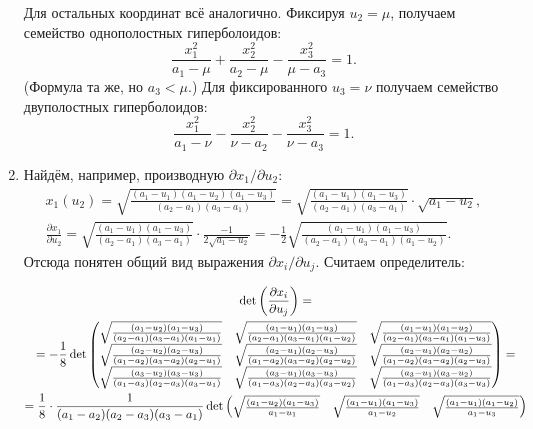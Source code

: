 \begin{solution}
\begin{enumerate}[nolistsep, label=(\arabic*)]
			Для остальных координат всё аналогично. Фиксируя $u_2 = \mu$, получаем семейство однополостных гиперболоидов:
			\[
				\frac{x_1^2}{a_1 - \mu} + \frac{x_2^2}{a_2 - \mu} - \frac{x_3^2}{\mu - a_3} = 1.
			\]
			(Формула та же, но $a_3 < \mu$.) Для фиксированного $u_3 = \nu$ получаем семейство двуполостных гиперболоидов:
			\[
				\frac{x_1^2}{a_1 - \nu} - \frac{x_2^2}{\nu - a_2} - \frac{x_3^2}{\nu - a_3} = 1.
			\]
		\item Найдём, например, производную $\partial x_1 / \partial u_2$:
			\begin{gather*}
				x_1(u_2) = \sqrt{\frac{(a_1 - u_1)(a_1 - u_2)(a_1 - u_3)}{(a_2 - a_1)(a_3 - a_1)}} = \sqrt{\frac{(a_1 - u_1)(a_1 - u_3)}{(a_2 - a_1)(a_3 - a_1)}} \cdot \sqrt{a_1 - u_2},\\
				\frac{\partial x_1}{\partial u_2} = \sqrt{\frac{(a_1 - u_1)(a_1 - u_3)}{(a_2 - a_1)(a_3 - a_1)}} \cdot \frac{-1}{2\sqrt{a_1 - u_2}} = -\frac{1}{2}\sqrt{\frac{(a_1 - u_1)(a_1 - u_3)}{(a_2 - a_1)(a_3 - a_1)(a_1 - u_2)}}.
			\end{gather*}
			Отсюда понятен общий вид выражения $\partial x_i / \partial u_j$. Считаем определитель:
			\begin{fullwidth}
				\begin{multline*}
					\det\left(\frac{\partial x_i}{\partial u_j}\right) =\\ = -\frac{1}{8}\det
					\begin{pmatrix}
						\sqrt{\frac{(a_1 - u_2)(a_1 - u_3)}{(a_2 - a_1)(a_3 - a_1)(a_1 - u_1)}} & \sqrt{\frac{(a_1 - u_1)(a_1 - u_3)}{(a_2 - a_1)(a_3 - a_1)(a_1 - u_2)}} & \sqrt{\frac{(a_1 - u_1)(a_1 - u_2)}{(a_2 - a_1)(a_3 - a_1)(a_1 - u_3)}}\\
						\sqrt{\frac{(a_2 - u_2)(a_2 - u_3)}{(a_1 - a_2)(a_3 - a_2)(a_2 - u_1)}} & \sqrt{\frac{(a_2 - u_1)(a_2 - u_3)}{(a_1 - a_2)(a_3 - a_2)(a_2 - u_2)}} & \sqrt{\frac{(a_2 - u_1)(a_2 - u_2)}{(a_1 - a_2)(a_3 - a_2)(a_2 - u_3)}}\\
						\sqrt{\frac{(a_3 - u_2)(a_3 - u_3)}{(a_1 - a_3)(a_2 - a_3)(a_3 - u_1)}} & \sqrt{\frac{(a_3 - u_1)(a_3 - u_3)}{(a_1 - a_3)(a_2 - a_3)(a_3 - u_2)}} & \sqrt{\frac{(a_3 - u_1)(a_3 - u_2)}{(a_1 - a_3)(a_2 - a_3)(a_3 - u_3)}}
					\end{pmatrix} =\\ =
					\frac{1}{8} \cdot \frac{1}{(a_1 - a_2)(a_2 - a_3)(a_3 - a_1)}\det
					\begin{pmatrix}
						\sqrt{\frac{(a_1 - u_2)(a_1 - u_3)}{a_1 - u_1}} & \sqrt{\frac{(a_1 - u_1)(a_1 - u_3)}{a_1 - u_2}} & \sqrt{\frac{(a_1 - u_1)(a_1 - u_2)}{a_1 - u_3}}\\

\end{pmatrix}
\end{multline*}
\end{fullwidth}
\end{enumerate}
\end{solution}
